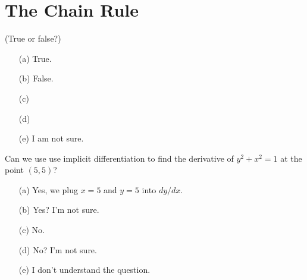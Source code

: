 \documentclass[14pt]{beamer}
\begin{document}
\section{The Chain Rule}
\begin{frame}
  (True or false?) 

  \medskip
  \begin{itemize} \setlength\itemsep{2ex}
    \item[(a)] True.
    \item[(b)] False.
    \item[(c)] 
    \item[(d)] 
    \item[(e)] I am not sure.
  \end{itemize} 
\end{frame}


\begin{frame}
  Can we use use implicit differentiation to find the derivative of \(y^{2} + x^{2} = 1\) at the point \((5,5)\)?

  \medskip
  \begin{itemize} \setlength\itemsep{2ex}
    \item[(a)] Yes, we plug \(x = 5\) and \(y = 5\) into \(dy/dx\).
    \item[(b)] Yes? I'm not sure.
    \item[(c)] No.
    \item[(d)] No? I'm not sure.
    \item[(e)] I don't understand the question.
  \end{itemize} 
\end{frame}



%
%
\end{document}

